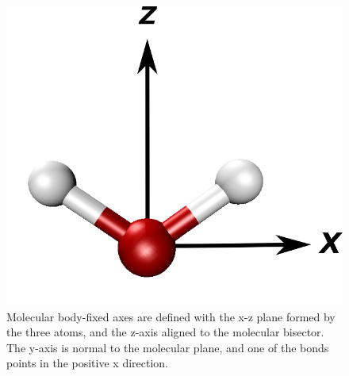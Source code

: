 
\begin{figure}[h!]
	\begin{center}
		\includegraphics[scale=1.0]{images/angle-cartoons/molecularframesmall.png}
		\caption{Molecular body-fixed axes are defined with the x-z plane formed by the three atoms, and the z-axis aligned to the molecular bisector. The y-axis is normal to the molecular plane, and one of the bonds points in the positive x direction.}
		\label{fig:molecular-frame}
	\end{center}
\end{figure}

